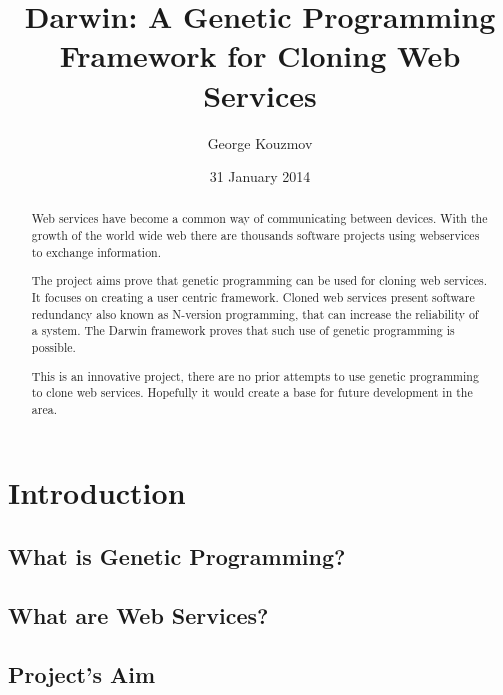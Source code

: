 \documentclass{l4proj}
\begin{document}
\title{Darwin: A Genetic Programming Framework for Cloning Web Services}
\author{George Kouzmov}
\date{31 January 2014}
\maketitle

\begin{abstract}
Web services have become a common way of communicating between devices. With the growth of the
world wide web there are thousands software projects using webservices to exchange information.

The project aims prove that genetic programming can be used for cloning web services. It focuses
on creating a user centric framework. Cloned web services present software redundancy
also known as N-version programming, that can increase the reliability of a system.
The Darwin framework proves that such use of genetic programming is possible.

This is an innovative project, there are no prior attempts to use genetic programming to clone
web services. Hopefully it would create a base for future development in the area. 
\end{abstract}

\tableofcontents
\listoffigures
\listoftables



\chapter{Introduction}

\section{What is Genetic Programming?}


\section{What are Web Services?}


\section{Project's Aim}


\end{document}
